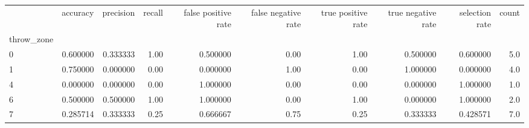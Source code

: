 \begin{tabular}{lrrrrrrrrr}
\toprule
{} &  accuracy &  precision &  recall &  false positive rate &  false negative rate &  true positive rate &  true negative rate &  selection rate &  count \\
throw\_zone &           &            &         &                      &                      &                     &                     &                 &        \\
\midrule
0          &  0.600000 &   0.333333 &    1.00 &             0.500000 &                 0.00 &                1.00 &            0.500000 &        0.600000 &    5.0 \\
1          &  0.750000 &   0.000000 &    0.00 &             0.000000 &                 1.00 &                0.00 &            1.000000 &        0.000000 &    4.0 \\
4          &  0.000000 &   0.000000 &    0.00 &             1.000000 &                 0.00 &                0.00 &            0.000000 &        1.000000 &    1.0 \\
6          &  0.500000 &   0.500000 &    1.00 &             1.000000 &                 0.00 &                1.00 &            0.000000 &        1.000000 &    2.0 \\
7          &  0.285714 &   0.333333 &    0.25 &             0.666667 &                 0.75 &                0.25 &            0.333333 &        0.428571 &    7.0 \\
\bottomrule
\end{tabular}
